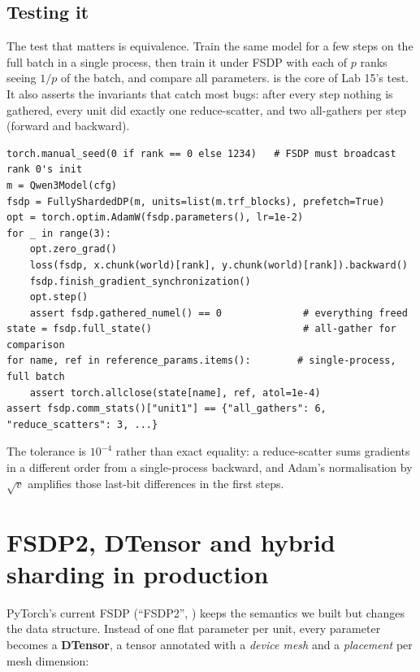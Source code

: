 \subsection{Testing it}

The test that matters is equivalence. Train the same model for a few steps on the full batch in a
single process, then train it under FSDP with each of $p$ ranks seeing $1/p$ of the batch, and
compare all parameters.  is the core of Lab 15's test. It also asserts the
invariants that catch most bugs: after every step nothing is gathered, every unit did exactly one
reduce-scatter, and two all-gathers per step (forward and backward).

\begin{lstlisting}[caption={Equivalence and invariant checks for FSDP (inside each of 3 ranks).},label={lst:sharding:test}]
torch.manual_seed(0 if rank == 0 else 1234)   # FSDP must broadcast rank 0's init
m = Qwen3Model(cfg)
fsdp = FullyShardedDP(m, units=list(m.trf_blocks), prefetch=True)
opt = torch.optim.AdamW(fsdp.parameters(), lr=1e-2)
for _ in range(3):
    opt.zero_grad()
    loss(fsdp, x.chunk(world)[rank], y.chunk(world)[rank]).backward()
    fsdp.finish_gradient_synchronization()
    opt.step()
    assert fsdp.gathered_numel() == 0              # everything freed
state = fsdp.full_state()                          # all-gather for comparison
for name, ref in reference_params.items():        # single-process, full batch
    assert torch.allclose(state[name], ref, atol=1e-4)
assert fsdp.comm_stats()["unit1"] == {"all_gathers": 6, "reduce_scatters": 3, ...}
\end{lstlisting}

The tolerance is $10^{-4}$ rather than exact equality: a reduce-scatter sums gradients in a
different order from a single-process backward, and Adam's normalisation by $\sqrt{v}$ amplifies
those last-bit differences in the first steps.

\section{FSDP2, DTensor and hybrid sharding in production}\label{sec:sharding:fsdp2}

PyTorch's current FSDP (``FSDP2'', ) keeps the
semantics we built but changes the data structure. Instead of one flat parameter per unit, every
parameter becomes a \textbf{DTensor}, a tensor annotated with a \emph{device mesh} and a
\emph{placement} per mesh dimension:

